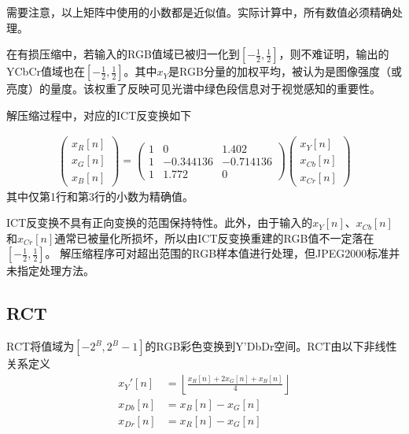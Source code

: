 需要注意，以上矩阵中使用的小数都是近似值。实际计算中，所有数值必须精确处理。\par
在有损压缩中，若输入的RGB值域已被归一化到$\left[-\frac{1}{2}, \frac{1}{2}\right]$，则不难证明，输出的YCbCr值域也在$\left[-\frac{1}{2}, \frac{1}{2}\right]$。其中$x_{Y}$是RGB分量的加权平均，被认为是图像强度（或亮度）的量度。该权重了反映可见光谱中绿色段信息对于视觉感知的重要性。\par

解压缩过程中，对应的ICT反变换如下

\begin{equation}
\begin{aligned}
\left(
\begin{array}{c}
x_{R}[n]\\
x_{G}[n]\\
x_{B}[n]
\end{array}
\right)
=
\left(
\begin{array}{ccc}
1 & 0 & 1.402\\
1 & -0.344136 & -0.714136\\
1 & 1.772 & 0
\end{array}
\right)
\left(
\begin{array}{c}
x_{Y}[n]\\
x_{Cb}[n]\\
x_{Cr}[n]
\end{array}
\right)
\end{aligned}
\end{equation}
其中仅第1行和第3行的小数为精确值。\par

ICT反变换不具有正向变换的范围保持特性。此外，由于输入的$x_{Y}[n]$、$x_{Cb}[n]$和$x_{Cr}[n]$通常已被量化所损坏，所以由ICT反变换重建的RGB值不一定落在$\left[-\frac{1}{2}, \frac{1}{2}\right]$。
解压缩程序可对超出范围的RGB样本值进行处理，但JPEG2000标准并未指定处理方法。\par

\subsection{RCT}
RCT将值域为$\left[-2^B, 2^B-1\right]$的RGB彩色变换到Y'DbDr空间。RCT由以下非线性关系定义
\begin{equation}
\begin{aligned}
x_{Y}'[n]&=\left \lfloor \frac{x_{R}[n]+2x_{G}[n]+x_{B}[n]}{4} \right \rfloor\\
x_{Db}[n]&=x_{B}[n]-x_{G}[n]\\
x_{Dr}[n]&=x_{R}[n]-x_{G}[n]
\end{aligned}
\end{equation}

